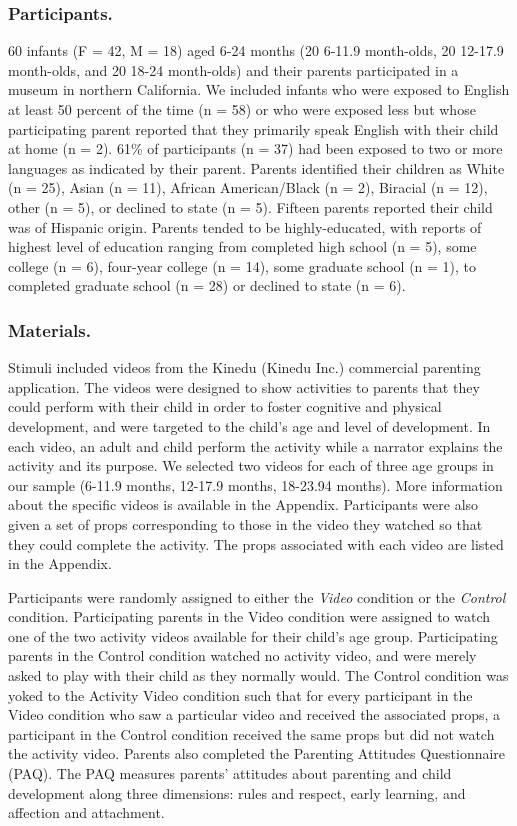 \documentclass[10pt, letterpaper]{article}
\begin{document}
\subsubsection{Participants.}\label{participants.}

60 infants (F = 42, M = 18) aged 6-24 months (20 6-11.9 month-olds, 20
12-17.9 month-olds, and 20 18-24 month-olds) and their parents
participated in a museum in northern California. We included infants who
were exposed to English at least 50 percent of the time (n = 58) or who
were exposed less but whose participating parent reported that they
primarily speak English with their child at home (n = 2). 61\% of
participants (n = 37) had been exposed to two or more languages as
indicated by their parent. Parents identified their children as White (n
= 25), Asian (n = 11), African American/Black (n = 2), Biracial (n =
12), other (n = 5), or declined to state (n = 5). Fifteen parents
reported their child was of Hispanic origin. Parents tended to be
highly-educated, with reports of highest level of education ranging from
completed high school (n = 5), some college (n = 6), four-year college
(n = 14), some graduate school (n = 1), to completed graduate school (n
= 28) or declined to state (n = 6).

\subsubsection{Materials.}\label{materials.}

Stimuli included videos from the Kinedu (Kinedu Inc.) commercial
parenting application. The videos were designed to show activities to
parents that they could perform with their child in order to foster
cognitive and physical development, and were targeted to the child's age
and level of development. In each video, an adult and child perform the
activity while a narrator explains the activity and its purpose. We
selected two videos for each of three age groups in our sample (6-11.9
months, 12-17.9 months, 18-23.94 months). More information about the
specific videos is available in the Appendix. Participants were also
given a set of props corresponding to those in the video they watched so
that they could complete the activity. The props associated with each
video are listed in the Appendix.

Participants were randomly assigned to either the \emph{Video} condition
or the \emph{Control} condition. Participating parents in the Video
condition were assigned to watch one of the two activity videos
available for their child's age group. Participating parents in the
Control condition watched no activity video, and were merely asked to
play with their child as they normally would. The Control condition was
yoked to the Activity Video condition such that for every participant in
the Video condition who saw a particular video and received the
associated props, a participant in the Control condition received the
same props but did not watch the activity video. Parents also completed
the Parenting Attitudes Questionnaire (PAQ). The PAQ measures parents'
attitudes about parenting and child development along three dimensions:
rules and respect, early learning, and affection and attachment.
\end{document}
